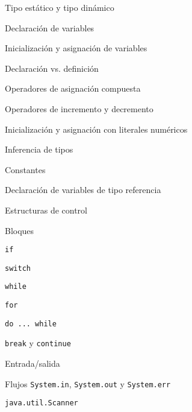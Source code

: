 \begin{longenum}
\begin{longenum}
\begin{longenum}
            \begin{longenum}
                \item Tipo estático y tipo dinámico
            \end{longenum}
            \item Declaración de variables
            \begin{longenum}
                \item Inicialización y asignación de variables
                \begin{longenum}
                    \item Declaración vs. definición
                    \item Operadores de asignación compuesta
                    \item Operadores de incremento y decremento
                    \item Inicialización y asignación con literales numéricos
                \end{longenum}
                \item Inferencia de tipos
                \item Constantes
                \item Declaración de variables de tipo referencia
            \end{longenum}
        \end{longenum}
        \item Estructuras de control
        \begin{longenum}
            \item Bloques
            \item \texttt{if}
            \item \texttt{switch}
            \item \texttt{while}
            \item \texttt{for}
            \item \texttt{do ... while}
            \item \texttt{break} y \texttt{continue}
        \end{longenum}
        \item Entrada/salida
        \begin{longenum}
            \item Flujos \texttt{System.in}, \texttt{System.out} y \texttt{System.err}
            \item \texttt{java.util.Scanner}
        \end{longenum}
    \end{longenum}

\end{longenum}

